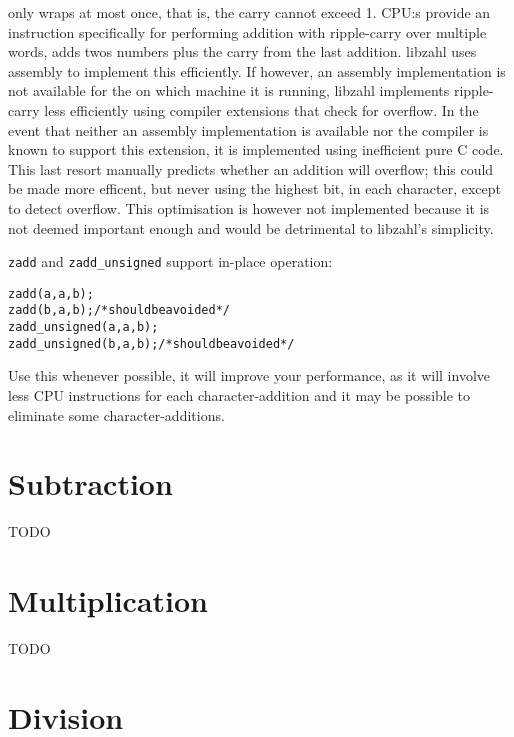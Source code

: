 \noindent
only wraps at most once, that is, the
carry cannot exceed 1. CPU:s provide an
instruction specifically for performing
addition with ripple-carry over multiple words,
adds twos numbers plus the carry from the
last addition. libzahl uses assembly to
implement this efficiently. If however, an
assembly implementation is not available for
the on which machine it is running, libzahl
implements ripple-carry less efficiently
using compiler extensions that check for
overflow. In the event that neither an
assembly implementation is available nor
the compiler is known to support this
extension, it is implemented using inefficient
pure C code. This last resort manually
predicts whether an addition will overflow;
this could be made more efficent, but never
using the highest bit, in each character,
except to detect overflow. This optimisation
is however not implemented because it is
not deemed important enough and would
be detrimental to libzahl's simplicity.

{\tt zadd} and {\tt zadd\_unsigned} support
in-place operation:

\begin{alltt}
   zadd(a, a, b);
   zadd(b, a, b);           \textcolor{c}{/* \textrm{should be avoided} */}
   zadd_unsigned(a, a, b);
   zadd_unsigned(b, a, b);  \textcolor{c}{/* \textrm{should be avoided} */}
\end{alltt}

\noindent
Use this whenever possible, it will improve
your performance, as it will involve less
CPU instructions for each character-addition
and it may be possible to eliminate some
character-additions.


\newpage
\section{Subtraction}
\label{sec:Subtraction}

TODO %


\newpage
\section{Multiplication}
\label{sec:Multiplication}

TODO %


\newpage
\section{Division}
\label{sec:Division}

